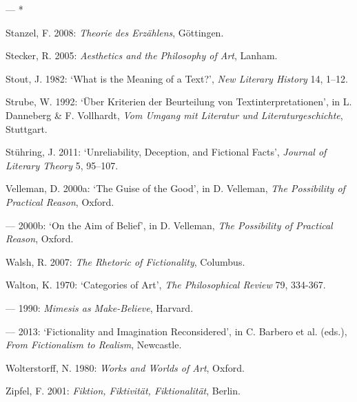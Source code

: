 \begin{hangparas}{.5cm}{1}
--- *

Stanzel, F. 2008: \emph{Theorie des Erz\"ahlens}, G\"ottingen. 

Stecker, R. 2005: \emph{Aesthetics and the Philosophy of Art}, Lanham.

Stout, J. 1982: `What is the Meaning of a Text?', \emph{New Literary History} 14, 1--12.

Strube, W. 1992: `\"Uber Kriterien der Beurteilung von Textinterpretationen', in L. Danneberg \& F. Vollhardt, \emph{Vom Umgang mit Literatur und Literaturgeschichte}, Stuttgart.

St\"uhring, J. 2011: `Unreliability, Deception, and Fictional Facts', \emph{Journal of Literary Theory} 5, 95--107.

Velleman, D. 2000a: `The Guise of the Good', in D. Velleman, \emph{The Possibility of Practical Reason}, Oxford.

--- 2000b: `On the Aim of Belief', in D. Velleman, \emph{The Possibility of Practical Reason}, Oxford.

Walsh, R. 2007: \emph{The Rhetoric of Fictionality}, Columbus.

Walton, K. 1970: `Categories of Art', \emph{The Philosophical Review} 79, 334-367.

--- 1990: \emph{Mimesis as Make-Believe}, Harvard.

--- 2013: `Fictionality and Imagination Reconsidered', in C. Barbero et al. (eds.), \emph{From Fictionalism to Realism}, Newcastle.

Wolterstorff, N. 1980: \emph{Works and Worlds of Art}, Oxford.

Zipfel, F. 2001: \emph{Fiktion, Fiktivit\"at, Fiktionalit\"at}, Berlin.

\end{hangparas}
